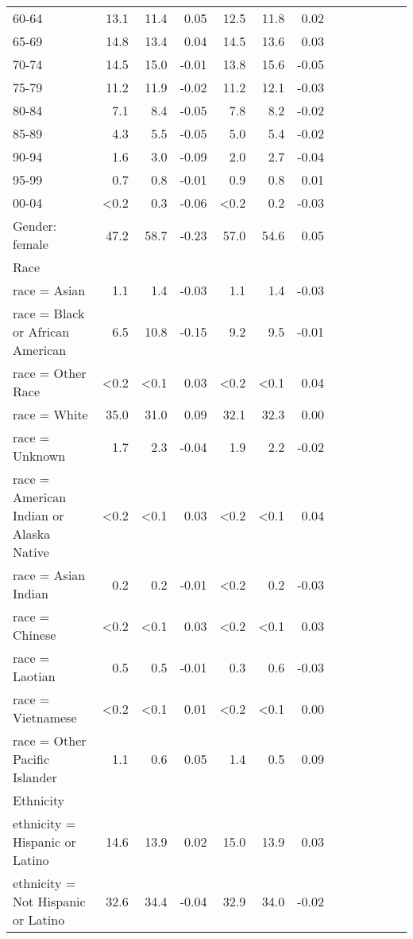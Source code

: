 \documentclass[11pt,]{article}
\begin{document}
\begin{longtable}{lrrrrrrrrrrrr}
      60-64 & 13.1 & 11.4 &  0.05 & 12.5 & 11.8 &  0.02 \\ 
      65-69 & 14.8 & 13.4 &  0.04 & 14.5 & 13.6 &  0.03 \\ 
      70-74 & 14.5 & 15.0 & -0.01 & 13.8 & 15.6 & -0.05 \\ 
      75-79 & 11.2 & 11.9 & -0.02 & 11.2 & 12.1 & -0.03 \\ 
      80-84 &  7.1 &  8.4 & -0.05 &  7.8 &  8.2 & -0.02 \\ 
      85-89 &  4.3 &  5.5 & -0.05 &  5.0 &  5.4 & -0.02 \\ 
      90-94 &  1.6 &  3.0 & -0.09 &  2.0 &  2.7 & -0.04 \\ 
      95-99 &  0.7 &  0.8 & -0.01 &  0.9 &  0.8 &  0.01 \\ 
      00-04 & <0.2 &  0.3 & -0.06 & <0.2 &  0.2 & -0.03 \\ 
  Gender: female & 47.2 & 58.7 & -0.23 & 57.0 & 54.6 &  0.05 \\ 
  Race &    &    &     &    &    &     \\ 
      race = Asian &  1.1 &  1.4 & -0.03 &  1.1 &  1.4 & -0.03 \\ 
      race = Black or African American &  6.5 & 10.8 & -0.15 &  9.2 &  9.5 & -0.01 \\ 
      race = Other Race & <0.2 & <0.1 &  0.03 & <0.2 & <0.1 &  0.04 \\ 
      race = White & 35.0 & 31.0 &  0.09 & 32.1 & 32.3 &  0.00 \\ 
      race = Unknown &  1.7 &  2.3 & -0.04 &  1.9 &  2.2 & -0.02 \\ 
      race = American Indian or Alaska Native & <0.2 & <0.1 &  0.03 & <0.2 & <0.1 &  0.04 \\ 
      race = Asian Indian &  0.2 &  0.2 & -0.01 & <0.2 &  0.2 & -0.03 \\ 
      race = Chinese & <0.2 & <0.1 &  0.03 & <0.2 & <0.1 &  0.03 \\ 
      race = Laotian &  0.5 &  0.5 & -0.01 &  0.3 &  0.6 & -0.03 \\ 
      race = Vietnamese & <0.2 & <0.1 &  0.01 & <0.2 & <0.1 &  0.00 \\ 
      race = Other Pacific Islander &  1.1 &  0.6 &  0.05 &  1.4 &  0.5 &  0.09 \\ 
  Ethnicity &    &    &     &    &    &     \\ 
      ethnicity = Hispanic or Latino & 14.6 & 13.9 &  0.02 & 15.0 & 13.9 &  0.03 \\ 
      ethnicity = Not Hispanic or Latino & 32.6 & 34.4 & -0.04 & 32.9 & 34.0 & -0.02 \\ 

\end{longtable}
\end{document}
